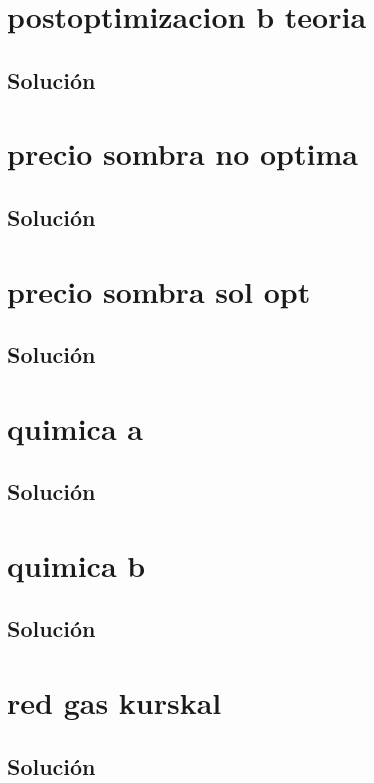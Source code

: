 \section{postoptimizacion b teoria}

\subsection*{Solución}

\clearpage
\section{precio sombra no optima}

\subsection*{Solución}

\clearpage
\section{precio sombra sol opt}

\subsection*{Solución}

\clearpage
\section{quimica a}

\subsection*{Solución}

\clearpage
\section{quimica b}

\subsection*{Solución}

\clearpage
\section{red gas kurskal}

\subsection*{Solución}

\clearpage
